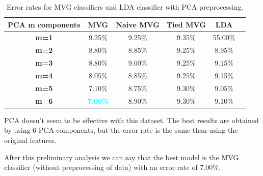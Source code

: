 \documentclass[12pt]{report}
\newcommand{\nnl}{%
    \newline
    \newline
}
\begin{document}
\begin{table}[H]
    \centering
    \begin{tabular}{|c|c|c|c|c|c|}
        \hline
        \rowcolor{blue!10}
        \textbf{PCA m components} & \textbf{MVG}                      & \textbf{Naive MVG} & \textbf{Tied MVG} & \textbf{LDA} \\
        \hline
        \textbf{m=1}              & 9.25\%                            & 9.25\%             & 9.35\%            & 55.00\%      \\
        \hline
        \textbf{m=2}              & 8.80\%                            & 8.85\%             & 9.25\%            & 8.95\%       \\
        \hline
        \textbf{m=3}              & 8.80\%                            & 9.00\%             & 9.25\%            & 9.15\%       \\
        \hline
        \textbf{m=4}              & 8.05\%                            & 8.85\%             & 9.25\%            & 9.15\%       \\
        \hline
        \textbf{m=5}              & 7.10\%                            & 8.75\%             & 9.30\%            & 9.05\%       \\
        \hline
        \textbf{m=6}              & \textcolor{cyan}{\textbf{7.00\%}} & 8.90\%             & 9.30\%            & 9.10\%       \\
        \hline
    \end{tabular}
    \caption{Error rates for MVG classifiers and LDA classifier with PCA preprocessing.}
    \label{tab:MVG_PCA_error}
\end{table}
\noindent
PCA doesn't seem to be effective with this dataset. The best results are obtained by using 6 PCA components, but the error rate is the same than using the original features.
\nnl
After this preliminary analysis we can say that the best model is the MVG classifier (without preprocessing of data) with an error rate of 7.00\%.
\end{document}
